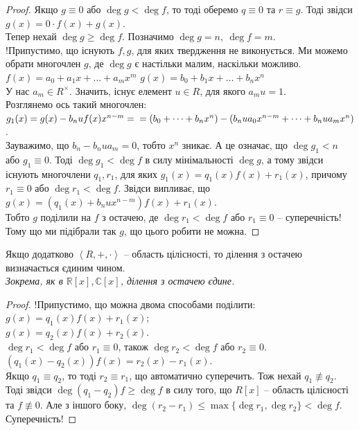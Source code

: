 \documentclass{math_library}
\begin{document}
\begin{proof}
Якщо $g \equiv 0$ або $\deg g < \deg f$, то тоді оберемо $q \equiv 0$ та $r \equiv g$. Тоді звідси $g(x) = 0 \cdot f(x) + g(x)$.
\bigskip \\
Тепер нехай $\deg g \geq \deg f$. Позначимо $\deg g = n,\ \deg f = m$.\\
!Припустимо, що існують $f,g$, для яких твердження не виконується. Ми можемо обрати многочлен $g$, де $\deg g$ є настільки малим, наскільки можливо.\\
$f(x) = a_0 + a_1 x + \dots + a_m x^m$ \quad $g(x) = b_0 + b_1 x + \dots + b_n x^n$\\
У нас $a_m \in R^\times$. Значить, існує елемент $u \in R$, для якого $a_m u = 1$.\\
Розглянемо ось такий многочлен: \\
$g_1(x) = g(x) - b_n u f(x) x^{n-m} = \\ = (b_0 + \dots + b_n x^n) - (b_n u a_0 x^{n-m} + \dots + b_n u a_m x^n)$. \\
Зауважимо, що $b_n - b_n u a_m = 0$, тобто $x^n$ зникає. А це означає, що $\deg g_1 < n$ або $g_1 \equiv 0$. Тоді $\deg g_1 < \deg f$ в силу мінімальності $\deg g$, а тому звідси існують многочлени $q_1,r_1$, для яких $g_1(x) = q_1(x) f(x) + r_1(x)$, причому $r_1 \equiv 0$ або $\deg r_1 < \deg f$. Звідси випливає, що\\
$g(x) = (q_1(x) + b_n u x^{n-m}) f(x) + r_1(x)$.\\
Тобто $g$ поділили на $f$ з остачею, де $\deg r_1 < \deg f$ або $r_1 \equiv 0$ -- суперечність! Тому що ми підібрали так $g$, що цього робити не можна.
\end{proof}

\begin{corollary}
Якщо додатково $\left< R,+,\cdot\right>$ -- область цілісності, то ділення з остачею визначається єдиним чином.\\
\textit{Зокрема, як в $\mathbb{R}[x], \mathbb{C}[x]$, ділення з остачею єдине.}
\end{corollary}

\begin{proof}
!Припустимо, що можна двома способами поділити:\\
$g(x) = q_1(x)f(x) + r_1(x)$;\\
$g(x) = q_2(x)f(x) + r_2(x)$.\\
$\deg r_1 < \deg f$ або $r_1 \equiv 0$, також $\deg r_2 < \deg f$ або $r_2 \equiv 0$.\\
$(q_1(x)-q_2(x))f(x) = r_2(x) - r_1(x)$.\\
Якщо $q_1 \equiv q_2$, то тоді $r_2 \equiv r_1$, що автоматично суперечить. Тож нехай $q_1 \not\equiv q_2$. Тоді звідси $\deg (q_1-q_2)f \geq \deg f$ в силу того, що $R[x]$ -- область цілісності та $f \not\equiv 0$. Але з іншого боку, $\deg (r_2-r_1) \leq \max \{ \deg r_1, \deg r_2 \} < \deg f$. Суперечність!
\end{proof}
\end{document}
